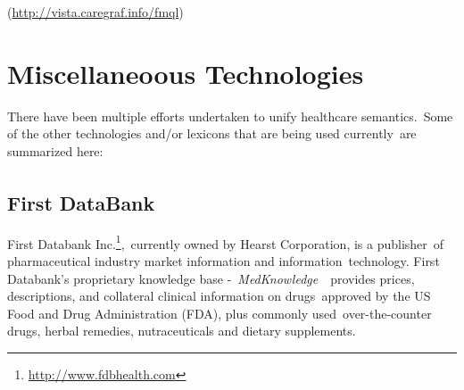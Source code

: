 \documentclass[DIV=calc, paper=a4, fontsize=12pt, onecolumn]{scrartcl}	 %
\begin{document}
(\url{http://vista.caregraf.info/fmql})\

\section{Miscellaneoous Technologies}
\label{sec:misc}

There have been multiple efforts undertaken to unify healthcare semantics.\
Some of the other technologies and/or lexicons that are being used currently\
are summarized here:

\subsection{First DataBank\textsuperscript{\texttrademark}}
\label{sec:fdb}
First Databank Inc.\footnote{\url{http://www.fdbhealth.com}},\
currently owned by Hearst Corporation, is a publisher\
of pharmaceutical industry market information and information\
technology. First Databank's proprietary knowledge base -\ 
\emph{MedKnowledge}~\citep{first_databank_fdb_2013}\
provides prices, descriptions, and collateral clinical information on drugs\
approved by the US Food and Drug Administration (FDA), plus commonly used\
over-the-counter drugs, herbal remedies, nutraceuticals and dietary supplements.\\


  
  {}

\end{document}
